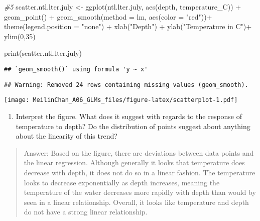 \documentclass[
]{article}
\newenvironment{Shaded}{\begin{snugshade}}{\end{snugshade}}
\newcommand{\AttributeTok}[1]{\textcolor[rgb]{0.77,0.63,0.00}{#1}}
\newcommand{\CommentTok}[1]{\textcolor[rgb]{0.56,0.35,0.01}{\textit{#1}}}
\newcommand{\DecValTok}[1]{\textcolor[rgb]{0.00,0.00,0.81}{#1}}
\newcommand{\FunctionTok}[1]{\textcolor[rgb]{0.00,0.00,0.00}{#1}}
\newcommand{\NormalTok}[1]{#1}
\newcommand{\OtherTok}[1]{\textcolor[rgb]{0.56,0.35,0.01}{#1}}
\newcommand{\SpecialCharTok}[1]{\textcolor[rgb]{0.00,0.00,0.00}{#1}}
\newcommand{\StringTok}[1]{\textcolor[rgb]{0.31,0.60,0.02}{#1}}
\providecommand{\tightlist}{%
  \setlength{\itemsep}{0pt}\setlength{\parskip}{0pt}}
\begin{document}
\begin{Shaded}
\begin{Highlighting}[]
\CommentTok{\#5}
\NormalTok{scatter.ntl.lter.july }\OtherTok{\textless{}{-}} \FunctionTok{ggplot}\NormalTok{(ntl.lter.july, }
                                \FunctionTok{aes}\NormalTok{(depth, temperature\_C)) }\SpecialCharTok{+}
  \FunctionTok{geom\_point}\NormalTok{() }\SpecialCharTok{+}
  \FunctionTok{geom\_smooth}\NormalTok{(}\AttributeTok{method =}\NormalTok{ lm, }\FunctionTok{aes}\NormalTok{(}\AttributeTok{color =} \StringTok{"red"}\NormalTok{))}\SpecialCharTok{+}
  \FunctionTok{theme}\NormalTok{(}\AttributeTok{legend.position =} \StringTok{"none"}\NormalTok{) }\SpecialCharTok{+}
  \FunctionTok{xlab}\NormalTok{(}\StringTok{"Depth"}\NormalTok{) }\SpecialCharTok{+}
  \FunctionTok{ylab}\NormalTok{(}\StringTok{"Temperature in C"}\NormalTok{)}\SpecialCharTok{+}
  \FunctionTok{ylim}\NormalTok{(}\DecValTok{0}\NormalTok{,}\DecValTok{35}\NormalTok{)}

\FunctionTok{print}\NormalTok{(scatter.ntl.lter.july)}
\end{Highlighting}
\end{Shaded}

\begin{verbatim}
## `geom_smooth()` using formula 'y ~ x'
\end{verbatim}

\begin{verbatim}
## Warning: Removed 24 rows containing missing values (geom_smooth).
\end{verbatim}

\texttt{[image: MeilinChan\_A06\_GLMs\_files/figure-latex/scatterplot-1.pdf]}

\begin{enumerate}
\def\labelenumi{\arabic{enumi}.}
\setcounter{enumi}{5}
\tightlist
\item
  Interpret the figure. What does it suggest with regards to the
  response of temperature to depth? Do the distribution of points
  suggest about anything about the linearity of this trend?
\end{enumerate}

\begin{quote}
Answer: Based on the figure, there are deviations between data points
and the linear regression. Although generally it looks that temperature
does decrease with depth, it does not do so in a linear fashion. The
temperature looks to decrease exponentially as depth increases, meaning
the temperature of the water decreases more rapidly with depth than
would by seen in a linear relationship. Overall, it looks like
temperature and depth do not have a strong linear relationship.
\end{quote}
\end{document}
